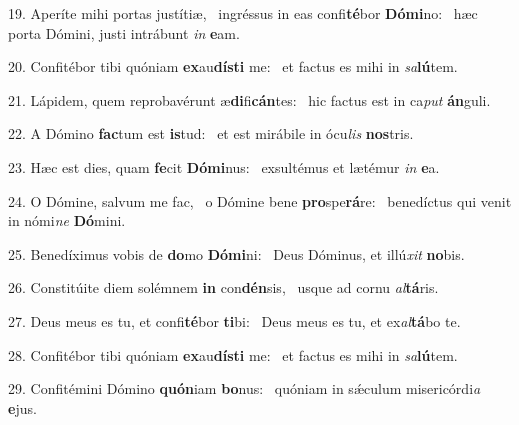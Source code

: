 19. Aperíte mihi portas justítiæ, \dag\  ingréssus in eas confi\textbf{té}bor \textbf{Dó}\textbf{mi}no: \ast\  hæc porta Dómini, justi intrábunt \textit{in} \textbf{e}am.\

20. Confitébor tibi quóniam \textbf{ex}au\textbf{dís}\textbf{ti} me: \ast\  et factus es mihi in \textit{sa}\textbf{lú}tem.\

21. Lápidem, quem reprobavérunt æ\textbf{di}fi\textbf{cán}tes: \ast\  hic factus est in ca\textit{put} \textbf{án}guli.\

22. A Dómino \textbf{fac}tum est \textbf{is}tud: \ast\  et est mirábile in ócu\textit{lis} \textbf{nos}tris.\

23. Hæc est dies, quam \textbf{fe}cit \textbf{Dó}\textbf{mi}nus: \ast\  exsultémus et lætémur \textit{in} \textbf{e}a.\

24. O Dómine, salvum me fac, \dag\  o Dómine bene \textbf{pro}spe\textbf{rá}re: \ast\  benedíctus qui venit in nómi\textit{ne} \textbf{Dó}mini.\

25. Benedíximus vobis de \textbf{do}mo \textbf{Dó}\textbf{mi}ni: \ast\  Deus Dóminus, et illú\textit{xit} \textbf{no}bis.\

26. Constitúite diem solémnem \textbf{in} con\textbf{dén}sis, \ast\  usque ad cornu \textit{al}\textbf{tá}ris.\

27. Deus meus es tu, et confi\textbf{té}bor \textbf{ti}bi: \ast\  Deus meus es tu, et ex\textit{al}\textbf{tá}bo te.\

28. Confitébor tibi quóniam \textbf{ex}au\textbf{dís}\textbf{ti} me: \ast\  et factus es mihi in \textit{sa}\textbf{lú}tem.\

29. Confitémini Dómino \textbf{quón}iam \textbf{bo}nus: \ast\  quóniam in sǽculum misericórdi\textit{a} \textbf{e}jus.\

